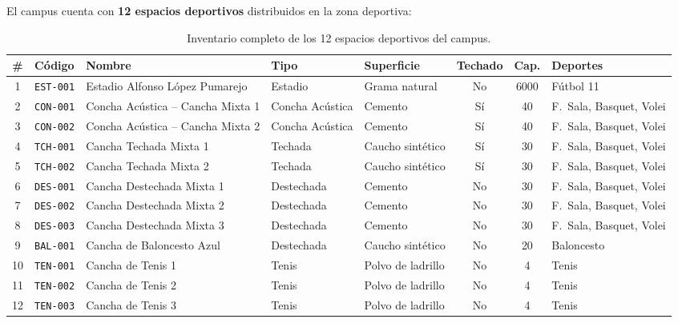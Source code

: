 \documentclass[12pt, a4paper]{article}
\begin{document}
El campus cuenta con \textbf{12 espacios deportivos} distribuidos en la zona deportiva:

\begin{landscape}
\begin{table}[H]
\centering
\renewcommand{\arraystretch}{1.2}
\small
\begin{tabular}{c l l l l c c l}
    \toprule
    \textbf{\#} & \textbf{Código} & \textbf{Nombre} & \textbf{Tipo} & \textbf{Superficie} & \textbf{Techado} & \textbf{Cap.} & \textbf{Deportes} \\
    \midrule
    1  & \texttt{EST-001} & Estadio Alfonso López Pumarejo        & Estadio          & Grama natural      & No & 6000 & Fútbol 11 \\
    2  & \texttt{CON-001} & Concha Acústica -- Cancha Mixta 1      & Concha Acústica  & Cemento            & Sí & 40   & F.~Sala, Basquet, Volei \\
    3  & \texttt{CON-002} & Concha Acústica -- Cancha Mixta 2      & Concha Acústica  & Cemento            & Sí & 40   & F.~Sala, Basquet, Volei \\
    4  & \texttt{TCH-001} & Cancha Techada Mixta 1                 & Techada          & Caucho sintético   & Sí & 30   & F.~Sala, Basquet, Volei \\
    5  & \texttt{TCH-002} & Cancha Techada Mixta 2                 & Techada          & Caucho sintético   & Sí & 30   & F.~Sala, Basquet, Volei \\
    6  & \texttt{DES-001} & Cancha Destechada Mixta 1              & Destechada       & Cemento            & No & 30   & F.~Sala, Basquet, Volei \\
    7  & \texttt{DES-002} & Cancha Destechada Mixta 2              & Destechada       & Cemento            & No & 30   & F.~Sala, Basquet, Volei \\
    8  & \texttt{DES-003} & Cancha Destechada Mixta 3              & Destechada       & Cemento            & No & 30   & F.~Sala, Basquet, Volei \\
    9  & \texttt{BAL-001} & Cancha de Baloncesto Azul              & Destechada       & Caucho sintético   & No & 20   & Baloncesto \\
    10 & \texttt{TEN-001} & Cancha de Tenis 1                      & Tenis            & Polvo de ladrillo  & No & 4    & Tenis \\
    11 & \texttt{TEN-002} & Cancha de Tenis 2                      & Tenis            & Polvo de ladrillo  & No & 4    & Tenis \\
    12 & \texttt{TEN-003} & Cancha de Tenis 3                      & Tenis            & Polvo de ladrillo  & No & 4    & Tenis \\
    \bottomrule
\end{tabular}
\caption{Inventario completo de los 12 espacios deportivos del campus.}
\label{tab:inventario}
\end{table}
\end{landscape}
\end{document}
